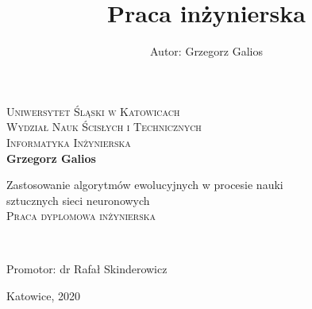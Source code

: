\newpage
\thispagestyle{empty}

\begin{onehalfspacing}
\begin{center}

\centering
\title{Praca inżynierska}
\author{Autor: Grzegorz Galios}

{\fontsize{17}{17}}\selectfont
\textsc{Uniwersytet Śląski w Katowicach \\[.3cm]
Wydział Nauk Ścisłych i Technicznych  \\[.3cm]
Informatyka Inżynierska  \\[2.5cm]}
\textbf{Grzegorz Galios \\[.3cm]}

\large 
{Zastosowanie algorytmów ewolucyjnych w procesie nauki \\
sztucznych sieci neuronowych} \\[.5cm]
\textsc{Praca dyplomowa inżynierska}
\end{center} ~\\[3cm]

\large
\begin{flushright}
Promotor: dr Rafał Skinderowicz \\
\end{flushright}

\begin{bottompar}
\begin{flushright}
Katowice, 2020
\end{flushright}
\end{bottompar}
\end{onehalfspacing}

\setcounter{page}{0} \pagestyle{plain}

\pagestyle{fancy}
